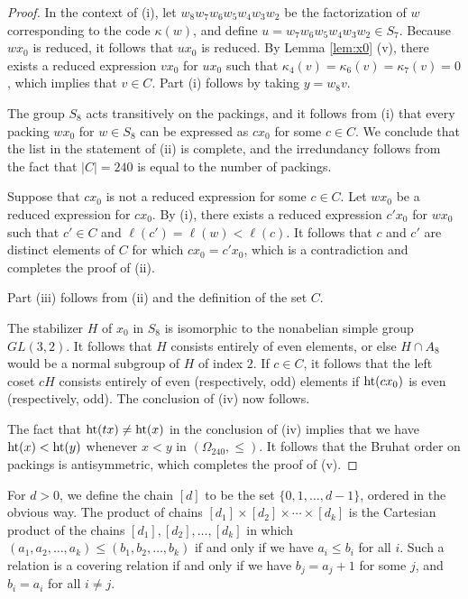 \documentclass{amsart}
\theoremstyle{plain}
\theoremstyle{definition}
\theoremstyle{remark}
\numberwithin{equation}{section}
\newcommand{\rootht}{\text{\rm ht}}
\newcommand{\qpx}{\Omega_{240}}
\newcommand{\leh}{\kappa}
\begin{document}
\begin{proof}
In the context of (i), let $w_8 w_7 w_6 w_5 w_4 w_3 w_2$ be the factorization of $w$ corresponding to the code 
$\leh(w)$, and define $u = w_7 w_6 w_5 w_4 w_3 w_2 \in S_7$. Because $w x_0$ is reduced, it follows that 
$u x_0$ is reduced. By Lemma \ref{lem:x0} (v), there exists a reduced expression $v x_0$ for $u x_0$ such that 
$\leh_4(v) = \leh_6(v) = \leh_7(v) = 0$, which implies that $v \in C$. Part (i) follows by taking
$y = w_8 v$.

The group $S_8$ acts transitively on the packings, and it follows from (i) that every 
packing $w x_0$ for $w \in S_8$ can be expressed as $c x_0$ for some $c \in C$. We conclude that the list in
the statement of (ii) is complete, and the irredundancy follows from the fact that $|C| = 240$ is equal to the number
of packings.

Suppose that $cx_0$ is not a reduced expression for some $c \in C$. Let $w x_0$ be
a reduced expression for $c x_0$. By (i), there exists a reduced expression $c' x_0$
for $w x_0$ such that $c' \in C$ and $\ell(c') = \ell(w) < \ell(c)$. It follows that
$c$ and $c'$ are distinct elements of $C$ for which $c x_0 = c' x_0$, which is a contradiction and completes
the proof of (ii).

Part (iii) follows from (ii) and the definition of the set $C$.

The stabilizer $H$ of $x_0$ in $S_8$ is isomorphic to the nonabelian simple group $GL(3, 2)$. It follows that
$H$ consists entirely of even elements, or else $H \cap A_8$ would be a normal subgroup of $H$ of index $2$.
If $c \in C$, it follows that the left coset $cH$ consists entirely of even (respectively, odd) elements 
if $\rootht(cx_0)$ is even (respectively, odd). The conclusion of (iv) now follows.

The fact that $\rootht(tx) \ne \rootht(x)$ in the conclusion of (iv) implies that we have $\rootht(x) < \rootht(y)$
whenever $x < y$ in $(\qpx, \leq)$. It follows that the Bruhat order on packings is antisymmetric, which completes
the proof of (v).
\end{proof}

For $d > 0$, we define the chain $[d]$ to be the set $\{0, 1, \ldots, d-1\}$, ordered in the obvious way. 
The product of chains $[d_1] \times [d_2] \times \cdots \times [d_k]$ is the Cartesian product of the
chains $[d_1], [d_2], \ldots, [d_k]$ in which $(a_1, a_2, \ldots, a_k) \leq (b_1, b_2, \ldots, b_k)$ if and
only if we have $a_i \leq b_i$ for all $i$. Such a relation is a covering relation if and only if we
have $b_j = a_j + 1$ for some $j$, and $b_i = a_i$ for all $i \ne j$.
\end{document}

